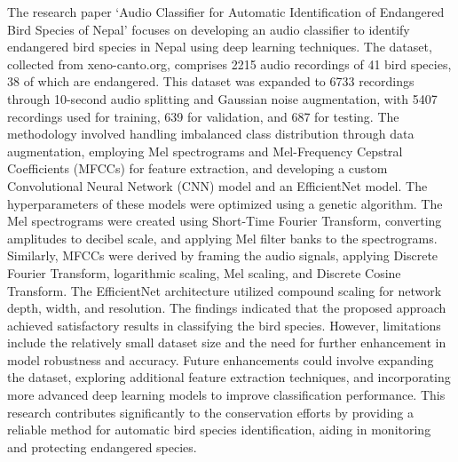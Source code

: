 The research paper `Audio Classifier for Automatic Identification of Endangered
Bird Species of Nepal' focuses on developing an audio classifier to identify
endangered bird species in Nepal using deep learning techniques. The dataset,
collected from xeno-canto.org, comprises 2215 audio recordings of 41 bird
species, 38 of which are endangered. This dataset was expanded to 6733
recordings through 10-second audio splitting and Gaussian noise augmentation,
with 5407 recordings used for training, 639 for validation, and 687 for
testing. The methodology involved handling imbalanced class distribution
through data augmentation, employing Mel spectrograms and Mel-Frequency
Cepstral Coefficients (MFCCs) for feature extraction, and developing a custom
Convolutional Neural Network (CNN) model and an EfficientNet model. The
hyperparameters of these models were optimized using a genetic algorithm. The
Mel spectrograms were created using Short-Time Fourier Transform, converting
amplitudes to decibel scale, and applying Mel filter banks to the spectrograms.
Similarly, MFCCs were derived by framing the audio signals, applying Discrete
Fourier Transform, logarithmic scaling, Mel scaling, and Discrete Cosine
Transform. The EfficientNet architecture utilized compound scaling for network
depth, width, and resolution. The findings indicated that the proposed approach
achieved satisfactory results in classifying the bird species. However,
limitations include the relatively small dataset size and the need for further
enhancement in model robustness and accuracy. Future enhancements could involve
expanding the dataset, exploring additional feature extraction techniques, and
incorporating more advanced deep learning models to improve classification
performance. This research contributes significantly to the conservation
efforts by providing a reliable method for automatic bird species
identification, aiding in monitoring and protecting endangered
species.\cite{gautam2023audio}\\

